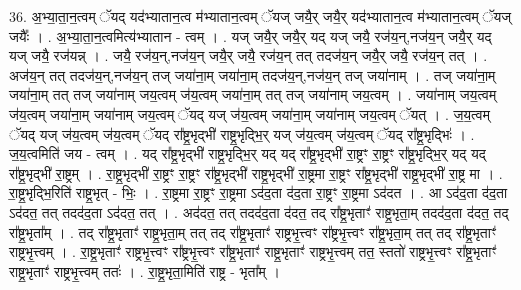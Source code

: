 \documentclass[17pt]{extarticle}
\begin{document}
36. अ॒भ्या॒ता॒न॒त्वम् ॅयद् यद॑भ्यातान॒त्व म॑भ्यातान॒त्वम् ॅयज् जयै॒र् जयै॒र् यद॑भ्यातान॒त्व म॑भ्यातान॒त्वम् ॅयज् जयैः᳚ । . अ॒भ्या॒ता॒न॒त्वमित्य॑भ्यातान - त्वम् । . यज् जयै॒र् जयै॒र् यद् यज् जयै॒ रज॑य॒न्,नज॑य॒न् जयै॒र् यद् यज् जयै॒ रज॑यन्न् । . जयै॒ रज॑य॒न्,नज॑य॒न् जयै॒र् जयै॒ रज॑य॒न् तत् तदज॑य॒न् जयै॒र् जयै॒ रज॑य॒न् तत् । . अज॑य॒न् तत् तदज॑य॒न्,नज॑य॒न् तज् जया॑ना॒म् जया॑ना॒म् तदज॑य॒न्,नज॑य॒न् तज् जया॑नाम् । . तज् जया॑ना॒म् जया॑ना॒म् तत् तज् जया॑नाम् जय॒त्वम् ज॑य॒त्वम् जया॑ना॒म् तत् तज् जया॑नाम् जय॒त्वम् । . जया॑नाम् जय॒त्वम् ज॑य॒त्वम् जया॑ना॒म् जया॑नाम् जय॒त्वम् ॅयद् यज् ज॑य॒त्वम् जया॑ना॒म् जया॑नाम् जय॒त्वम् ॅयत् । . ज॒य॒त्वम् ॅयद् यज् ज॑य॒त्वम् ज॑य॒त्वम् ॅयद् रा᳚ष्ट्र॒भृद्भी॑ राष्ट्र॒भृद्भि॒र् यज् ज॑य॒त्वम् ज॑य॒त्वम् ॅयद् रा᳚ष्ट्र॒भृद्भिः॑ । . ज॒य॒त्वमिति॑ जय - त्वम् । . यद् रा᳚ष्ट्र॒भृद्भी॑ राष्ट्र॒भृद्भि॒र् यद् यद् रा᳚ष्ट्र॒भृद्भी॑ रा॒ष्ट्रꣳ रा॒ष्ट्रꣳ रा᳚ष्ट्र॒भृद्भि॒र् यद् यद् रा᳚ष्ट्र॒भृद्भी॑ रा॒ष्ट्रम् । . रा॒ष्ट्र॒भृद्भी॑ रा॒ष्ट्रꣳ रा॒ष्ट्रꣳ रा᳚ष्ट्र॒भृद्भी॑ राष्ट्र॒भृद्भी॑ रा॒ष्ट्रमा रा॒ष्ट्रꣳ 
रा᳚ष्ट्र॒भृद्भी॑ राष्ट्र॒भृद्भी॑ रा॒ष्ट्र मा । . रा॒ष्ट्र॒भृद्भि॒रिति॑ राष्ट्र॒भृत् - भिः॒ । . रा॒ष्ट्रमा रा॒ष्ट्रꣳ रा॒ष्ट्रमा ऽद॑द॒ता द॑द॒ता रा॒ष्ट्रꣳ रा॒ष्ट्रमा ऽद॑दत । . आ ऽद॑द॒ता द॑द॒ता ऽद॑दत॒ तत् तदद॑द॒ता ऽद॑दत॒ तत् । . अद॑दत॒ तत् तदद॑द॒ता द॑दत॒ तद् रा᳚ष्ट्र॒भृताꣳ॑ राष्ट्र॒भृता॒म् तदद॑द॒ता द॑दत॒ तद् 
रा᳚ष्ट्र॒भृता᳚म् । . तद् रा᳚ष्ट्र॒भृताꣳ॑ राष्ट्र॒भृता॒म् तत् तद् रा᳚ष्ट्र॒भृताꣳ॑ राष्ट्रभृ॒त्त्वꣳ रा᳚ष्ट्रभृ॒त्त्वꣳ 
रा᳚ष्ट्र॒भृता॒म् तत् तद् रा᳚ष्ट्र॒भृताꣳ॑ राष्ट्रभृ॒त्त्वम् । . रा॒ष्ट्र॒भृताꣳ॑ राष्ट्रभृ॒त्त्वꣳ रा᳚ष्ट्रभृ॒त्त्वꣳ रा᳚ष्ट्र॒भृताꣳ॑ राष्ट्र॒भृताꣳ॑ राष्ट्रभृ॒त्त्वम् तत॒ स्ततो॑ राष्ट्रभृ॒त्त्वꣳ रा᳚ष्ट्र॒भृताꣳ॑ राष्ट्र॒भृताꣳ॑ राष्ट्रभृ॒त्त्वम् ततः॑ । . रा॒ष्ट्र॒भृता॒मिति॑ राष्ट्र - भृता᳚म् । \newline
\end{document}
